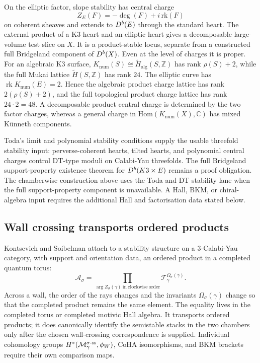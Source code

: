 On the elliptic factor, slope stability has central charge
\[
  Z_E(F)=-\deg(F)+i\,\mathrm{rk}(F)
\]
on coherent sheaves and extends to $D^{b}(E)$ through the standard heart.
The external product of a K3 heart and an elliptic heart gives a
decomposable large-volume test slice on $X$.  It is a product-stable
locus, separate from a constructed full Bridgeland component of
\(D^{b}(X)\).  Even at
the level of charges it is proper.  For an algebraic K3 surface,
$K_{\mathrm{num}}(S)\cong \widetilde H_{\mathrm{alg}}(S,\mathbb Z)$ has
rank $\rho(S)+2$, while the full Mukai lattice
$\widetilde H(S,\mathbb Z)$ has rank $24$.  The elliptic curve has
$\operatorname{rk}K_{\mathrm{num}}(E)=2$.  Hence the algebraic product
charge lattice has rank $2(\rho(S)+2)$, and the full topological product
charge lattice has rank $24\cdot 2=48$.  A decomposable product central
charge is determined by the two factor charges, whereas a general charge
in $\mathrm{Hom}(K_{\mathrm{num}}(X),\mathbb C)$ has mixed K\"unneth
components.

Toda's limit and polynomial stability conditions supply the usable
threefold stability input: perverse-coherent hearts, tilted hearts, and
polynomial central charges control DT-type moduli on Calabi-Yau
threefolds.  The full Bridgeland support-property existence theorem for
$D^{b}(K3\times E)$ remains a proof obligation.  The chamberwise
construction above uses the Toda and DT stability lane when the full
support-property component is unavailable.  A Hall, BKM, or
chiral-algebra input requires the additional Hall and factorisation data
stated below.

\subsection*{Wall crossing transports ordered products}

Kontsevich and Soibelman attach to a stability structure on a
3-Calabi-Yau category, with support and orientation data, an ordered
product in a completed quantum torus:
\[
  \mathcal A_\sigma
  =
  \prod_{\arg Z_\sigma(\gamma)\ \mathrm{in\ clockwise\ order}}
  \mathcal T_\gamma^{\Omega_\sigma(\gamma)}.
\]
Across a wall, the order of the rays changes and the invariants
$\Omega_\sigma(\gamma)$ change so that the completed product remains
the same element.  The equality lives in the completed torus or
completed motivic Hall algebra.  It transports ordered products; it does
canonically identify the semistable stacks in the two chambers only
after the chosen wall-crossing correspondence is supplied.
Individual cohomology groups $H^*(\mathcal{M}_\gamma^{\sigma\text{-ss}},\phi_W)$,
CoHA isomorphisms, and BKM brackets require their own comparison maps.


